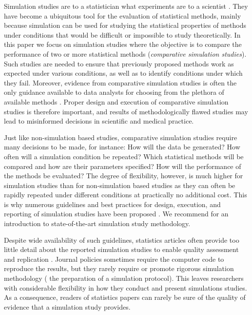 \documentclass[a4paper, 11pt]{article}
\begin{document}
Simulation studies are to a statistician what experiments are to a scientist 
\citep{Hoaglin1975}. They have become a ubiquitous tool for the evaluation of 
statistical methods, mainly because simulation can be used 
for studying the statistical properties of methods under
conditions that would be difficult or impossible to study theoretically.
In this paper we focus on simulation studies where the objective is to compare
the performance of two or more statistical methods (\emph{comparative simulation
studies}). Such studies are needed to ensure that previously proposed methods
work as expected under various conditions, as well as to identify conditions under which
they fail. Moreover, evidence from comparative simulation studies is often the
only guidance available to data analysts for choosing from the plethora of
available methods \citep{Boulesteix2013, Boulesteix2017b}. Proper design and
execution of comparative simulation studies is therefore important, and 
results of methodologically flawed studies may lead to misinformed 
decisions in scientific and medical practice.

Just like non-simulation based studies, comparative simulation 
studies require many decisions to be made, for instance: How will the data be generated?
How often will a simulation condition be repeated? Which statistical methods will be 
compared and how are their parameters specified? How will the performance of the methods 
be evaluated? The degree of flexibility, however, is much higher for simulation studies
than for non-simulation based studies as they can often be rapidly repeated under 
different conditions at practically no additional cost. This is why numerous guidelines
and best practices for design, execution, and reporting of simulation studies
have been proposed \citep{Hoaglin1975, Holford2000, Burton2006, Smith2010,
OKelly2016, Monks2018, Elofsson2019, Morris2019, Boulesteix2020B}. We
recommend \citet{Morris2019} for an introduction to state-of-the-art simulation
study methodology. 

Despite wide availability of such guidelines, statistics articles often 
provide too little detail about the reported simulation studies to enable
quality assessment and replication \citep[see \eg{} the literature reviews 
in][]{Burton2006, Morris2019}. Journal policies sometimes require the computer 
code to reproduce the results, but they rarely require or promote
rigorous simulation methodology (\eg{} the preparation of a simulation protocol). This 
leaves researchers with considerable flexibility in how they conduct and present
simulations studies. As a consequence, readers of statistics papers can
rarely be sure of the quality of evidence that a simulation study provides. 
\end{document}
